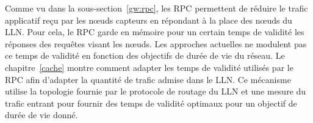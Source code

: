 Comme vu dans la sous-section~\ref{gw:rpc}, les \acf{RPC} permettent de réduire le trafic applicatif reçu par les nœuds capteurs en répondant à la place des nœuds du \ac{LLN}.
Pour cela, le \acl{RPC} garde en mémoire pour un certain temps de validité les réponses des requêtes visant les nœuds.
Les approches actuelles ne modulent pas ce temps de validité en fonction des objectifs de durée de vie du réseau.
Le chapitre~\ref{cache} montre comment adapter les temps de validité utilisés par le \ac{RPC} afin d'adapter la quantité de trafic admise dans le \ac{LLN}.
Ce mécanisme utilise la topologie fournie par le protocole de routage du \ac{LLN} et une mesure du trafic entrant pour fournir des temps de validité optimaux pour un objectif de durée de vie donné.
